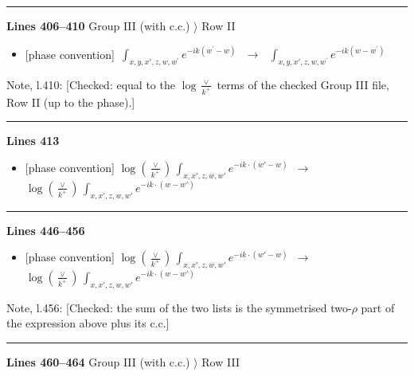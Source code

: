 \documentclass[10pt]{article}
\newenvironment{notebox}{\def\FrameCommand{{\color{notebar}\vrule width 1.5pt}\hspace{6pt}}\MakeFramed{\advance\hsize-\width\FrameRestore}\small}{\endMakeFramed}
\begin{document}
\noindent\rule{\linewidth}{0.3pt}\par\noindent\textbf{Lines 406--410} \quad \textsf{Group III (with c.c.) $\rangle$ Row II} \par
\begin{itemize}[leftmargin=2.2em,itemsep=1pt,topsep=2pt]
\item[\textbf{l.406}] \textsf{\small [phase convention]} $\displaystyle \, \int_{x,y,x',z,w,w^{\prime}} e^{-ik(w^{\prime}-w)}\,$\ $\longrightarrow$\ $\displaystyle \, \int_{x,y,x',z,w,w^{\prime}} e^{-ik(w-w^{\prime})}\,$
\end{itemize}
\begin{notebox}\textsf{\small Note, l.410:} [Checked: equal to the $\log\frac{\vee}{k^{+}}$ terms of the checked Group III file, Row II (up to the phase).]\end{notebox}
\noindent\rule{\linewidth}{0.3pt}\par\noindent\textbf{Lines 413} \par
\begin{itemize}[leftmargin=2.2em,itemsep=1pt,topsep=2pt]
\item[\textbf{l.413}] \textsf{\small [phase convention]} $\displaystyle \log{(\frac{\vee}{k^{+}})}\, \int_{x,x',z,w,w'}e^{-ik\cdot(w'-w)}$\ $\longrightarrow$\ $\displaystyle \log{(\frac{\vee}{k^{+}})}\, \int_{x,x',z,w,w'}e^{-ik\cdot(w-w')}$
\end{itemize}
\noindent\rule{\linewidth}{0.3pt}\par\noindent\textbf{Lines 446--456} \par
\begin{itemize}[leftmargin=2.2em,itemsep=1pt,topsep=2pt]
\item[\textbf{l.446}] \textsf{\small [phase convention]} $\displaystyle \log{(\frac{\vee}{k^{+}})}\, \int_{x,x',z,w,w'}e^{-ik\cdot(w'-w)}$\ $\longrightarrow$\ $\displaystyle \log{(\frac{\vee}{k^{+}})}\, \int_{x,x',z,w,w'}e^{-ik\cdot(w-w')}$
\end{itemize}
\begin{notebox}\textsf{\small Note, l.456:} [Checked: the sum of the two lists is the symmetrised two-$\rho$ part of the expression above plus its c.c.]\end{notebox}
\noindent\rule{\linewidth}{0.3pt}\par\noindent\textbf{Lines 460--464} \quad \textsf{Group III (with c.c.) $\rangle$ Row III} \par
\end{document}
